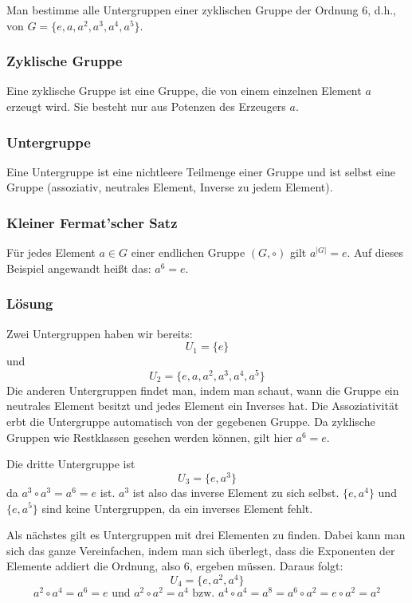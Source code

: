 \documentclass[a4paper, 12pt, margins=3cm]{homework}
\begin{document}
  \begin{problem}
    Man bestimme alle Untergruppen einer zyklischen Gruppe der Ordnung 6, d.h.,
    von $G = \{e,a,a^2,a^3,a^4,a^5\}$.
  \end{problem}
  \begin{solution}\hfill
    \subsubsection*{Zyklische Gruppe}
      Eine zyklische Gruppe ist eine Gruppe, die von einem einzelnen Element $a$
      erzeugt wird. Sie besteht nur aus Potenzen des Erzeugers $a$.
    \subsubsection*{Untergruppe}
      Eine Untergruppe ist eine nichtleere Teilmenge einer Gruppe und ist selbst
      eine Gruppe (assoziativ, neutrales Element, Inverse zu jedem Element).
    \subsubsection*{Kleiner Fermat'scher Satz}
      Für jedes Element $a\in G$ einer endlichen Gruppe $(G,\circ)$ gilt $a^{|G|} = e$.
      Auf dieses Beispiel angewandt heißt das: $a^6 = e$.
    \subsubsection*{Lösung}
      Zwei Untergruppen haben wir bereits: 
        \[ U_1 = \{e\} \]
      und
        \[ U_2 = \{e,a,a^2,a^3,a^4,a^5\} \]
      Die anderen Untergruppen findet man, indem man schaut, wann die Gruppe ein
      neutrales Element besitzt und jedes Element ein Inverses hat. Die Assoziativität
      erbt die Untergruppe automatisch von der gegebenen Gruppe. Da zyklische Gruppen
      wie Restklassen gesehen werden können, gilt hier $a^6 = e$.

      Die dritte Untergruppe ist 
        \[ U_3 = \{e,a^3\} \]
      da $a^3\circ a^3 = a^6 = e$ ist. $a^3$ ist also das inverse Element zu sich selbst.
      $\{e,a^4\}$ und $\{e,a^5\}$ sind keine Untergruppen, da ein inverses Element fehlt.

      Als nächstes gilt es Untergruppen mit drei Elementen zu finden. Dabei kann 
      man sich das ganze Vereinfachen, indem man sich überlegt, dass die Exponenten
      der Elemente addiert die Ordnung, also 6, ergeben müssen. Daraus folgt:
        \[ U_4 = \{e, a^2, a^4\} \] 
        \[ a^2\circ a^4 = a^6 = e \text{ und } a^2\circ a^2 = a^4 \text{ bzw. } a^4\circ a^4 = a^8 = a^6\circ a^2 = e\circ a^2 = a^2 \]

  \end{solution}
\end{document}

